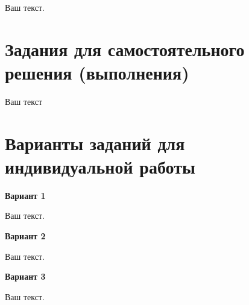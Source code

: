 Ваш текст.

\newpage%
\section*{Задания для самостоятельного решения (выполнения)}%

Ваш текст


\newpage%


\normalsize\section*{Варианты заданий для индивидуальной работы}%

\begin{center}
   \bf{Вариант 1}
\end{center}

Ваш текст.

\begin{center}
   \bf{Вариант 2}
\end{center}

Ваш текст.

\begin{center}
   \bf{Вариант 3}
\end{center}

Ваш текст.


